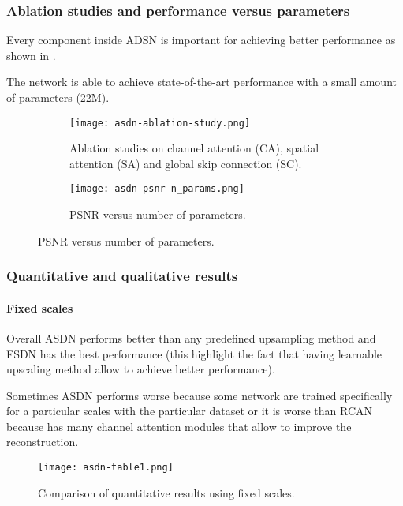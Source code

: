 \subsubsection{Ablation studies and performance versus parameters}
Every component inside ADSN is important for achieving better performance as shown in .

The network is able to achieve state-of-the-art performance with a small amount of parameters (22M).

\begin{figure}[H]
    \begin{subfigure}{\textwidth}
        \centering
        \texttt{[image: asdn-ablation-study.png]}
        \caption{Ablation studies on channel attention (CA), spatial attention (SA) and global skip connection (SC).}\label{asdn:ablation-studies}
    \end{subfigure}
    \begin{subfigure}{\textwidth}
        \centering
        \texttt{[image: asdn-psnr-n\_params.png]}
        \caption{PSNR versus number of parameters.}
    \end{subfigure}    
\end{figure}

\subsubsection{Quantitative and qualitative results}

\paragraph{Fixed scales}
Overall ASDN performs better than any predefined upsampling method and FSDN has the best performance (this highlight the fact that having learnable upscaling method allow to achieve better performance).

Sometimes ASDN performs worse because some network are trained specifically for a particular scales with the particular dataset or it is worse than RCAN because has many channel attention modules that allow to improve the reconstruction.
\begin{figure}[H]
    \centering
    \texttt{[image: asdn-table1.png]}
    \caption{Comparison of quantitative results using fixed scales.}
\end{figure}

